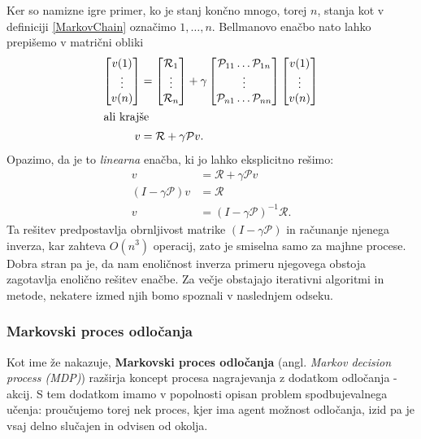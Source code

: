 \documentclass[12pt,a4paper]{amsart}
\theoremstyle{definition} %
\theoremstyle{plain} %
\begin{document}
Ker so namizne igre primer, ko je stanj končno mnogo, torej $n$, stanja kot v definiciji \ref{MarkovChain}
označimo $1, \dots, n$. Bellmanovo enačbo nato lahko prepišemo v matrični obliki
\begin{align*}
    \begin{bmatrix}
        v(1) \\ 
        \vdots \\ 
        v(n)
    \end{bmatrix}
    &=
    \begin{bmatrix}
        \mathcal{R}_1 \\ 
        \vdots \\ 
        \mathcal{R}_n 
    \end{bmatrix}
    + \gamma
    \begin{bmatrix}
        \mathcal{P}_{11} \dots \mathcal{P}_{1n} \\ 
        \vdots \\ 
        \mathcal{P}_{n1} \dots \mathcal{P}_{nn}
    \end{bmatrix}
    \begin{bmatrix}
        v(1) \\ 
        \vdots \\ 
        v(n)
    \end{bmatrix} \\
    \intertext{ali krajše}
    v &= \mathcal{R} + \gamma \mathcal{P}v.
\end{align*}
Opazimo, da je to \textit{linearna} enačba, ki jo lahko eksplicitno rešimo: 
\begin{align*}
    v &= \mathcal{R} + \gamma \mathcal{P}v \\
    (I - \gamma \mathcal{P}) v &= \mathcal{R} \\
    v &= (I - \gamma \mathcal{P})^{-1} \mathcal{R}.
\end{align*}
Ta rešitev predpostavlja obrnljivost matrike $(I - \gamma \mathcal{P})$ in računanje njenega 
inverza, kar zahteva $O(n^3)$ operacij, zato je smiselna samo za majhne procese. Dobra stran pa je, 
da nam enoličnost inverza primeru njegovega obstoja zagotavlja enolično rešitev enačbe. Za večje 
obstajajo iterativni algoritmi in metode, nekatere izmed njih bomo spoznali v naslednjem odseku.

\subsubsection{Markovski proces odločanja}
Kot ime že nakazuje, \textbf{Markovski proces odločanja} (angl. \textit{Markov decision process (MDP)}) 
razširja koncept procesa nagrajevanja z dodatkom odločanja - akcij. S tem dodatkom imamo v popolnosti 
opisan problem spodbujevalnega učenja: proučujemo torej nek proces, kjer ima agent možnost odločanja, 
izid pa je vsaj delno slučajen in odvisen od okolja. 
\end{document}
